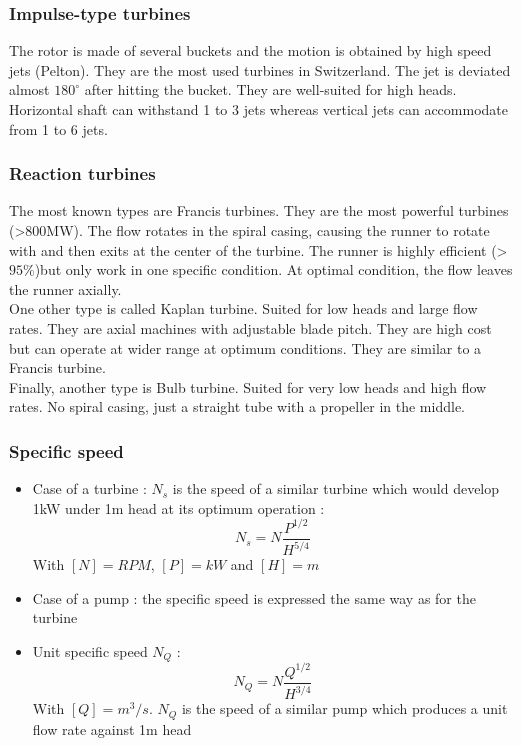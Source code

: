 \documentclass[../main.tex]{subfiles}
\begin{document}
\subsubsection{Impulse-type turbines}
The rotor is made of several buckets and the motion is obtained by high speed jets (Pelton). They are the most used turbines in Switzerland. The jet is deviated almost $180^\circ$ after hitting the bucket. They are well-suited for high heads. Horizontal shaft can withstand 1 to 3 jets whereas vertical jets can accommodate from 1 to 6 jets.\\

\subsubsection{Reaction turbines}
The most known types are Francis turbines. They are the most powerful turbines (>800MW). The flow rotates in the spiral casing, causing the runner to rotate with and then exits at the center of the turbine. The runner is highly efficient (>$95\%$)but only work in one specific condition. At optimal condition, the flow leaves the runner axially. \\

One other type is called Kaplan turbine. Suited for low heads and large flow rates. They are axial machines with adjustable blade pitch. They are high cost but can operate at wider range at optimum conditions. They are similar to a Francis turbine.\\

Finally, another type is Bulb turbine. Suited for very low heads and high flow rates. No spiral casing, just a straight tube with a propeller in the middle. 

\subsubsection{Specific speed}
\begin{itemize}
    \item Case of a turbine : $N_s$ is the speed of a similar turbine which would develop 1kW under 1m head at its optimum operation : \begin{equation}
        N_s = N \frac{P^{1/2}}{H^{5/4}}
    \end{equation}
    With $[N] = RPM$, $[P] = kW$ and $[H] = m$
    \item Case of a pump : the specific speed is expressed the same way as for the turbine
    \item Unit specific speed $N_Q$ : \begin{equation}
        N_Q = N \frac{Q^{1/2}}{H^{3/4}}
    \end{equation}
    With $[Q] = m^3/s$. $N_Q$ is the speed of a similar pump which produces a unit flow rate against 1m head
\end{itemize}
\end{document}
